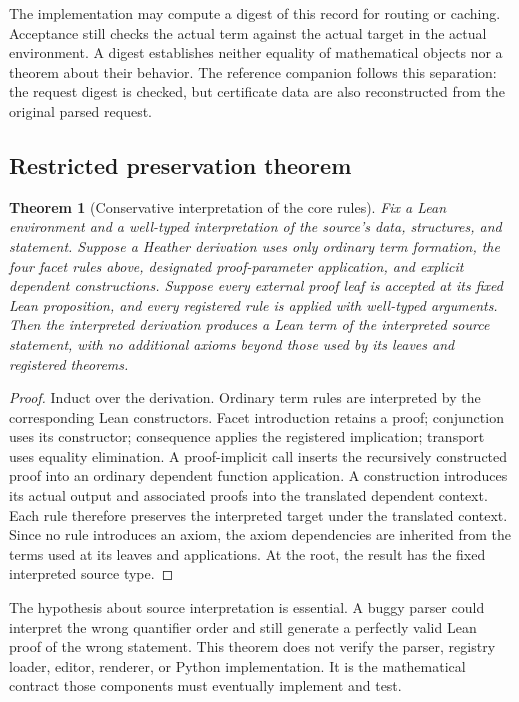 \documentclass[11pt,letterpaper]{article}
\newtheorem{theorem}{Theorem}[section]
\theoremstyle{definition}\newtheorem{definition}[theorem]{Definition}
\theoremstyle{remark}\newtheorem{remark}[theorem]{Remark}
\begin{document}
The implementation may compute a digest of this record for routing or caching.
Acceptance still checks the actual term against the actual target in the
actual environment. A digest establishes neither equality of mathematical
objects nor a theorem about their behavior. The reference companion follows
this separation: the request digest is checked, but certificate data are also
reconstructed from the original parsed request.

\subsection{Restricted preservation theorem}
\begin{theorem}[Conservative interpretation of the core rules]\label{thm:preserve}
Fix a Lean environment and a well-typed interpretation of the source's data,
structures, and statement. Suppose a Heather derivation uses only ordinary
term formation, the four facet rules above, designated proof-parameter
application, and explicit dependent constructions. Suppose every external
proof leaf is accepted at its fixed Lean proposition, and every registered
rule is applied with well-typed arguments. Then the interpreted derivation
produces a Lean term of the interpreted source statement, with no additional
axioms beyond those used by its leaves and registered theorems.
\end{theorem}
\begin{proof}
Induct over the derivation. Ordinary term rules are interpreted by the
corresponding Lean constructors. Facet introduction retains a proof; conjunction
uses its constructor; consequence applies the registered implication; transport
uses equality elimination. A proof-implicit call inserts the recursively
constructed proof into an ordinary dependent function application. A
construction introduces its actual output and associated proofs into the
translated dependent context. Each rule therefore preserves the interpreted
target under the translated context. Since no rule introduces an axiom, the
axiom dependencies are inherited from the terms used at its leaves and
applications. At the root, the result has the fixed interpreted source type.
\end{proof}

The hypothesis about source interpretation is essential. A buggy parser could
interpret the wrong quantifier order and still generate a perfectly valid Lean
proof of the wrong statement. This theorem does not verify the parser, registry
loader, editor, renderer, or Python implementation. It is the mathematical
contract those components must eventually implement and test.
\end{document}
